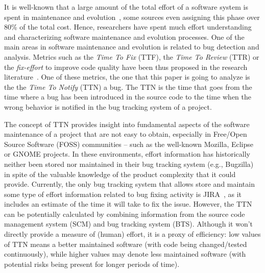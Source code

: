 \documentclass[10pt, conference]{IEEEtran}
\begin{document}
It is well-known that a large amount of the total effort of a software system is spent in maintenance and evolution~\cite{tassey2002economic}, some sources even assigning this phase over 80\% of the total cost. Hence, researchers have spent much effort understanding and characterizing software maintenance and evolution processes. One of the main areas in software maintenance and evolution is related to bug detection and analysis. Metrics such as the \emph{Time To Fix} (TTF), the \emph{Time To Review} (TTR) or the \emph{fix-effort} to improve code quality have been thus proposed in the research literature~\cite{kim2006long}\cite{mockus2002two}. One of these metrics, the one that this paper is going to analyze is the the \emph{Time To Notify} (TTN) a bug. The TTN is the time that goes from the time where a bug has been introduced in the source code to the time when the wrong behavior is notified in the bug tracking system of a project. 

The concept of TTN provides insight into fundamental aspects of the software maintenance of a project that are not easy to obtain, especially in Free/Open Source Software (FOSS) communities -- such as the well-known Mozilla, Eclipse or GNOME projects. In these environments, effort information has historically neither been stored nor maintained in their bug tracking system (e.g., Bugzilla) in spite of the valuable knowledge of the product complexity that it  could provide. Currently, the only bug tracking system that allows store and maintain some type of effort information related to bug fixing activity is JIRA~\cite{weiss2007long}, as it includes an estimate of the time it will take to fix the issue. However, the TTN can be potentially calculated by combining information from the source code management system (SCM) and bug tracking system (BTS). Although it won't directly provide a measure of (human) effort, it is a proxy of efficiency: low values of TTN means a better maintained software (with code being changed/tested continuously), while higher values may denote less maintained software (with potential risks being present for longer periods of time).
\end{document}
